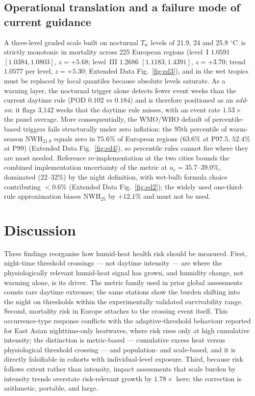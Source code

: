 \documentclass[12pt,a4paper]{article}
\newcommand{\dd}{\ensuremath{\,^{\circ}\mathrm{C}}}
\begin{document}
\subsection*{Operational translation and a failure mode of current guidance}
A three-level graded scale built on nocturnal $T_\mathrm{w}$ levels of 21.9, 24 and 25.8\,\dd~is
strictly monotonic in mortality across 225 European regions (level~I $1.0591$
$[1.0384,1.0803]$, $z=+5.68$; level~III $1.2686$ $[1.1183,1.4391]$, $z=+3.70$; trend $1.0577$ per
level, $z=+5.30$; Extended Data Fig.~\ref{fig:ed3}), and in the wet tropics must be replaced by
local quantiles because absolute levels saturate. As a warning layer, the nocturnal trigger alone
detects fewer event weeks than the current daytime rule (POD $0.102$ vs $0.184$) and is therefore
positioned as an \emph{add-on}: it flags 3,142 weeks that the daytime rule misses, with an event
rate $1.53\times$ the panel average. More consequentially, the WMO/WHO default of percentile-based
triggers fails structurally under zero inflation: the 95th percentile of warm-season
$\mathrm{NWH}_{21.9}$ equals zero in $75.6\%$ of European regions ($63.6\%$ at P97.5, $52.4\%$ at
P99) (Extended Data Fig.~\ref{fig:ed4}), so percentile rules cannot fire where they are most needed.
Reference re-implementation at the two cities bounds the combined implementation uncertainty of the
metric at $u_c=35.7$--$39.0\%$, dominated (22--32\%) by the night definition, with wet-bulb formula
choice contributing $<0.6\%$ (Extended Data Fig.~\ref{fig:ed2}); the widely used one-third-rule
approximation biases $\mathrm{NWH}_{25}$ by $+12.1\%$ and must not be used.

\section*{Discussion}
Three findings reorganise how humid-heat health risk should be measured. First, night-time
threshold crossings --- not daytime intensity --- are where the physiologically relevant humid-heat
signal has grown, and humidity change, not warming alone, is its driver. The metric family used in
prior global assessments\citep{Raymond2020,Willett2023,Coffel2018,Tuholske2021} counts rare daytime
extremes; the same stations show the burden shifting into the night on thresholds within the
experimentally validated survivability range\citep{Vanos2023,Meade2025}. Second, mortality risk in
Europe attaches to the crossing event itself. This occurrence-type response conflicts with the
adaptive-threshold behaviour reported for East Asian nighttime-only heatwaves, where risk rises
only at high cumulative intensity\citep{Liu2025}; the distinction is metric-based --- cumulative
excess heat versus physiological threshold crossing --- and population- and scale-based, and it is
directly falsifiable in cohorts with individual-level exposure. Third, because risk follows extent
rather than intensity, impact assessments that scale burden by intensity trends overstate
risk-relevant growth by $1.78\times$ here; the correction is arithmetic, portable, and large.
\end{document}
